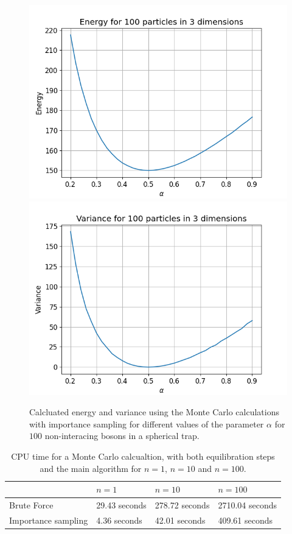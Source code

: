 \documentclass[a4paper, 10pt, english]{revtex4-2} %
\begin{document}
    \begin{figure}[!ht]
        \centering
        \includegraphics[width=\imwidth]{figures/Energy_C_100.png}
        \includegraphics[width=\imwidth]{figures/Varience_C_100.png}
        \caption{Calcluated energy and variance using the Monte Carlo calculations with importance sampling for different values of the parameter $\alpha$ for $100$ non-interacing bosons in a spherical trap.}
        \label{fig: C100}
    \end{figure}\newpage
    
    \begin{table}[!ht]
        \begin{tabular}{|l|l|l|l|}
        \hline
                            & $n=1$         & $n=10$         & $n=100$         \\ \hline
        Brute Force         & 29.43 seconds & 278.72 seconds & 2710.04 seconds \\ \hline
        Importance sampling & 4.36 seconds  & 42.01 seconds  & 409.61 seconds  \\ \hline
        \end{tabular}
        \caption{CPU time for a Monte Carlo calcualtion, with both equilibration steps and the main algorithm for $n=1$, $n=10$ and $n=100$.}
        \label{table: time spent}
    \end{table}
\end{document}
